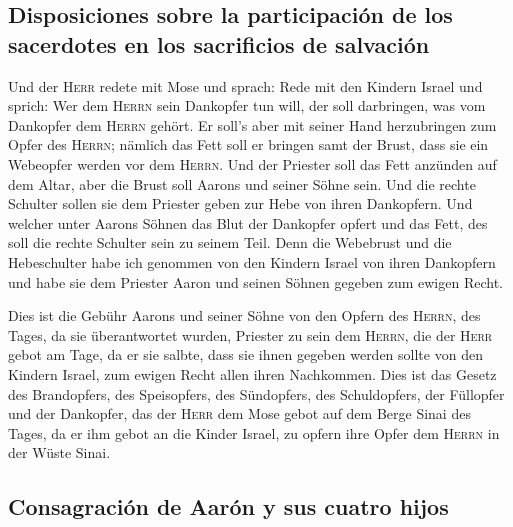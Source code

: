 \hypertarget{disposiciones-sobre-la-participaciuxf3n-de-los-sacerdotes-en-los-sacrificios-de-salvaciuxf3n}{%
\subsection{Disposiciones sobre la participación de los sacerdotes en
los sacrificios de
salvación}\label{disposiciones-sobre-la-participaciuxf3n-de-los-sacerdotes-en-los-sacrificios-de-salvaciuxf3n}}

 Und der \textsc{Herr} redete mit Mose und sprach:
 Rede mit den Kindern Israel und sprich: Wer dem
\textsc{Herrn} sein Dankopfer tun will, der soll darbringen, was vom
Dankopfer dem \textsc{Herrn} gehört.  Er soll's aber mit
seiner Hand herzubringen zum Opfer des \textsc{Herrn}; nämlich das Fett
soll er bringen samt der Brust, dass sie ein Webeopfer werden vor dem
\textsc{Herrn}.  Und der Priester soll das Fett anzünden
auf dem Altar, aber die Brust soll Aarons und seiner Söhne sein.
 Und die rechte Schulter sollen sie dem Priester geben
zur Hebe von ihren Dankopfern.  Und welcher unter Aarons
Söhnen das Blut der Dankopfer opfert und das Fett, des soll die rechte
Schulter sein zu seinem Teil.  Denn die Webebrust und die
Hebeschulter habe ich genommen von den Kindern Israel von ihren
Dankopfern und habe sie dem Priester Aaron und seinen Söhnen gegeben zum
ewigen Recht.

 Dies ist die Gebühr Aarons und seiner Söhne von den
Opfern des \textsc{Herrn}, des Tages, da sie überantwortet wurden,
Priester zu sein dem \textsc{Herrn},  die der
\textsc{Herr} gebot am Tage, da er sie salbte, dass sie ihnen gegeben
werden sollte von den Kindern Israel, zum ewigen Recht allen ihren
Nachkommen.  Dies ist das Gesetz des Brandopfers, des
Speisopfers, des Sündopfers, des Schuldopfers, der Füllopfer und der
Dankopfer,  das der \textsc{Herr} dem Mose gebot auf dem
Berge Sinai des Tages, da er ihm gebot an die Kinder Israel, zu opfern
ihre Opfer dem \textsc{Herrn} in der Wüste Sinai.

\hypertarget{consagraciuxf3n-de-aaruxf3n-y-sus-cuatro-hijos}{%
\subsection{Consagración de Aarón y sus cuatro
hijos}\label{consagraciuxf3n-de-aaruxf3n-y-sus-cuatro-hijos}}

